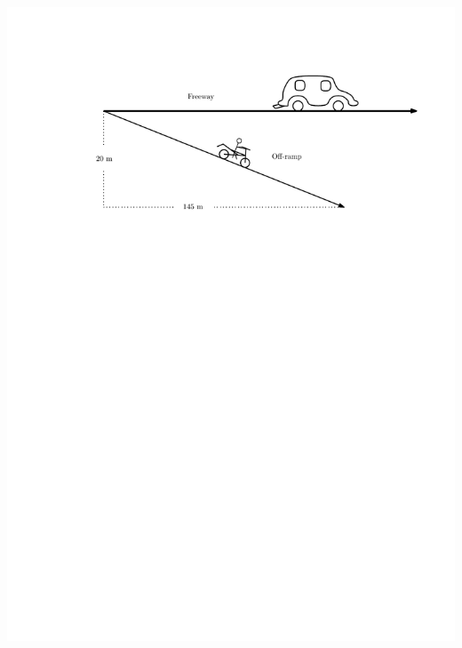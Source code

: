 \documentclass[12pt]{report}
\begin{document}
\begin{enumerate}
\vspace{1cm}

\includegraphics{motorcyclist}


\vfill
\end{enumerate}
\end{document}
